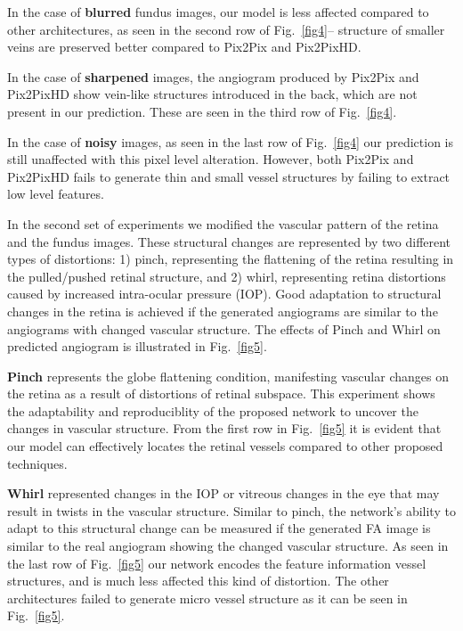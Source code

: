 \documentclass[runningheads]{llncs}
\begin{document}
In the case of \textbf{blurred} fundus images, our model is less affected compared to other architectures, as seen in the second row of Fig.~\ref{fig4}-- structure of smaller veins are preserved better compared to Pix2Pix and Pix2PixHD.

In the case of \textbf{sharpened} images, the angiogram produced by Pix2Pix and Pix2PixHD show vein-like structures introduced in the back, which are not present in our prediction. These are seen in the third row of Fig.~\ref{fig4}.

In the case of \textbf{noisy} images, as seen in the last row of Fig.~\ref{fig4} our prediction is still unaffected with this pixel level alteration. However, both Pix2Pix and Pix2PixHD fails to generate thin and small vessel structures by failing to extract low level features.



In the second set of experiments we modified the vascular pattern of the retina and the fundus images. These structural changes are represented by two different types of distortions: 1) pinch, representing the flattening of the retina resulting in the pulled/pushed retinal structure, and 2) whirl, representing retina distortions caused by increased intra-ocular pressure (IOP). Good adaptation to structural changes in the retina is achieved if the generated angiograms are similar to the angiograms with changed vascular structure. The effects of Pinch and Whirl on predicted angiogram is illustrated in Fig.~\ref{fig5}. 

\textbf{Pinch} represents the globe flattening condition, manifesting vascular changes on the retina as a result of distortions of retinal subspace. This experiment shows the adaptability and reproduciblity of the proposed network to uncover the changes in vascular structure. From the first row in Fig.~\ref{fig5} it is evident that our model can effectively locates the retinal vessels compared to other proposed techniques.

\textbf{Whirl} represented changes in the IOP or vitreous changes in the eye that may result in twists in the vascular structure. Similar to pinch, the network's ability to adapt to this structural change can be measured if the generated FA image is similar to the real angiogram showing the changed vascular structure. As seen in the last row of Fig.~\ref{fig5} our network encodes the feature information vessel structures, and is much less affected this kind of distortion. The other architectures failed to generate micro vessel structure as it can be seen in Fig.~\ref{fig5}.
\end{document}
